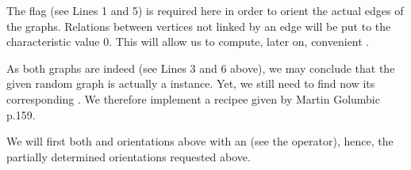 \documentclass[a4paper,12pt,english]{sphinxhowto}
\begin{document}
\begin{sphinxVerbatim}[commandchars=\\\{\},numbers=left,firstnumber=1,stepnumber=1]
  
  
  
  
\end{sphinxVerbatim}

The  flag (see Lines 1 and 5) is required here in order to orient  the actual edges of the graphs. Relations between vertices not linked by an edge will be put to the  characteristic value 0. This will allow us to compute, later on, convenient .

As both graphs are indeed  (see Lines 3 and 6 above), we may conclude that the given random graph  is actually a  instance. Yet, we still need to find now its corresponding . We therefore implement a recipee given by Martin Golumbic  p.159.

We will first  both  and  orientations above with an  (see the  operator), hence, the partially determined orientations requested above.
\end{document}
